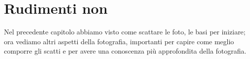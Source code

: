 \chapter{Rudimenti non} \label{ch:rudimenti_non}

Nel precedente capitolo abbiamo visto come scattare le foto, le basi per iniziare; ora vediamo altri aspetti della fotografia, importanti per capire come meglio comporre gli scatti e per avere una conoscenza più approfondita della fotografia.